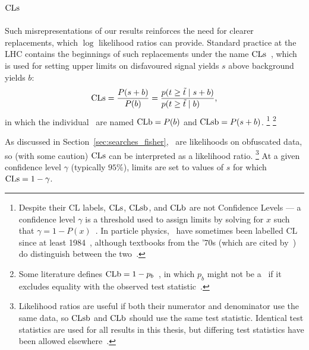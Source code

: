 \subsection{\texorpdfstring{$\mathrm{CLs}$}{CLs}}
Such misrepresentations of our results reinforces the need for clearer
replacements, which $\log$ likelihood ratios can provide.
Standard practice at the LHC contains the beginnings of such
replacements under the name $\mathrm{CLs}$~\cite{
read2000modified,
Read2002cls,
junk1999confidence,
read1997optimal,
bock1998lower,
etde1998prospects,
lep2000searches,
lep2003search,
Murray2010heretic,
cern2011procedure,
pdg2022ynf
},
which is used for setting upper limits on disfavoured signal yields $s$
above background yields $b$:
\begin{equation}
\label{eqn:searches_cls}
\cls
=
\frac{P(s + b)}{P(b)}
=
\frac{
\prob{t \geq \tilde{t}}{s + b}
}{
\prob{t \geq \tilde{t}}{b}\hfill
}
,
\end{equation}
in which the individual \pvalues\ are named
$\mathrm{CLb} = P(b)$ and
$\mathrm{CLsb} = P(s + b)$.%
\footnote{%
Despite their $\mathrm{CL}$ labels, $\mathrm{CLs}$, $\mathrm{CLsb}$, and $\mathrm{CLb}$ are not
Confidence Levels ---
a confidence level $\gamma$ is a threshold used to assign limits by solving
for $x$ such that $\gamma = 1 - P(x)$~\cite{pdg1996}.
In particle physics, \pvalues\ have sometimes been labelled $\mathrm{CL}$ since
at least 1984~\cite{pdg1984}, although textbooks from the '70s (which are cited
by~\cite{pdg1984}) do distinguish between the two~\cite{
eadie1971statistical,
frodesen1979probability
}.%
}%
\footnote{%
Some literature defines $\mathrm{CLb} = 1 - p_b$~\cite{
Cowan:2010js,
pdg2022ynf
},
in which $p_b$ might not be a \pvalue\ if it excludes equality with the
observed test statistic~\cite{cern2011procedure}.
}

As discussed in Section~\ref{sec:searches_fisher}, \pvalues\ are likelihoods
on obfuscated data, so (with some caution) $\mathrm{CLs}$ can be interpreted as a
likelihood ratio.%
\footnote{%
Likelihood ratios are useful if both their numerator and denominator use the
same data, so $\mathrm{CLsb}$ and $\mathrm{CLb}$ should use the same test statistic.
Identical test statistics are used for all results in this thesis, but
differing test statistics have been allowed elsewhere~\cite{bock1998lower}.
}%
At a given confidence level $\gamma$ (typically $95\%$), limits are set to
values of $s$ for which $\mathrm{CLs} = 1 - \gamma$.


